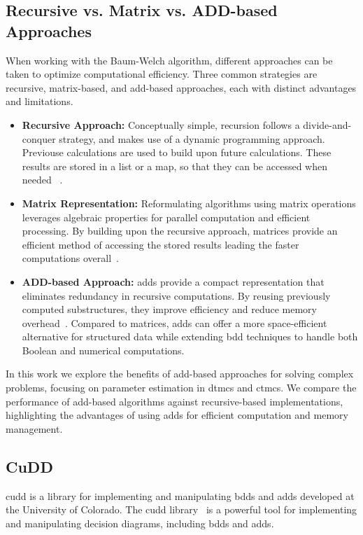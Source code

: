 \subsection{Recursive vs. Matrix vs. ADD-based Approaches}\label{subsec:approaches}
When working with the Baum-Welch algorithm, different approaches can be taken to optimize computational efficiency.
Three common strategies are recursive, matrix-based, and \gls{add}-based approaches, each with distinct advantages and limitations.
\begin{itemize}
      \item \textbf{Recursive Approach:} Conceptually simple, recursion follows a divide-and-conquer strategy, and makes use of a dynamic programming approach. Previouse calculations are used to build upon future calculations. These results are stored in a list or a map, so that they can be accessed when needed ~\cite[Chapter 4]{cormen2022introduction}.
      \item \textbf{Matrix Representation:} Reformulating algorithms using matrix operations leverages algebraic properties for parallel computation and efficient processing.
            By building upon the recursive approach, matrices provide an efficient method of accessing the stored results leading the faster computations overall~\cite[Chapter 4, 15 \& 28]{cormen2022introduction}.
      \item \textbf{ADD-based Approach:} \glspl{add} provide a compact representation that eliminates redundancy in recursive computations.
            By reusing previously computed substructures, they improve efficiency and reduce memory overhead~\cite{bahar1997algebric}.
            Compared to matrices, \glspl{add} can offer a more space-efficient alternative for structured data while extending \gls{bdd} techniques to handle both Boolean and numerical computations.
\end{itemize}

In this work we explore the benefits of \gls{add}-based approaches for solving complex problems, focusing on parameter estimation in \glspl{dtmc} and \glspl{ctmc}.
We compare the performance of \gls{add}-based algorithms against recursive-based implementations, highlighting the advantages of using \glspl{add} for efficient computation and memory management.

\subsection{CuDD}\label{subsec:cudd}
\acrfull{cudd} is a library for implementing and manipulating \glspl{bdd} and \glspl{add} developed at the University of Colorado.
The \gls{cudd} library~\cite{somenzi1997cudd} is a powerful tool for implementing and manipulating decision diagrams, including \glspl{bdd} and \glspl{add}.

